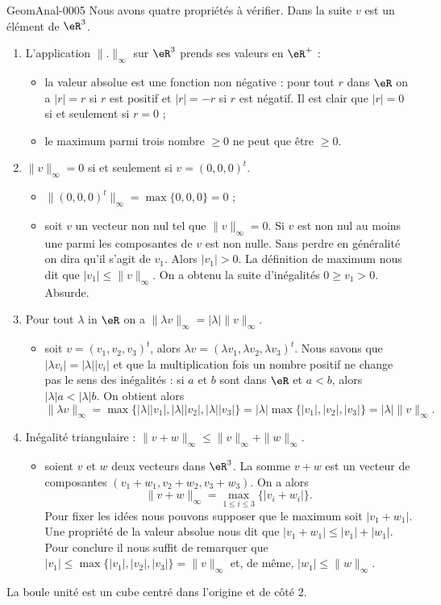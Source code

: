 \begin{corrige}{GeomAnal-0005}
Nous avons quatre propriétés à vérifier. Dans la suite $v$ est un élément de $\eR^3$.
\begin{enumerate}
\item L'application $\| . \|_{\infty}$ sur $\eR^3$ prends ses valeurs en $\eR^+$ :
  \begin{itemize}
  \item la valeur absolue est une fonction non négative : pour tout $r$ dans $\eR$ on a $|r|= r$ si $r$ est positif et $|r|= -r$ si $r$ est négatif. Il est clair que $|r|=0$ si et seulement si $r=0$ ;
  \item le maximum parmi trois nombre $\geq 0$ ne peut que être $\geq 0$.
  \end{itemize}
\item $\| v \|_{\infty}= 0$ si et seulement si $v=(0, 0, 0)^t$. 
  \begin{itemize}
  \item $\| (0,0,0)^t \|_{\infty}= \max\{0, 0 ,0\}= 0$ ;
  \item soit $v$ un vecteur non nul tel que $\| v \|_{\infty}= 0$. Si $v$ est non nul au moins une parmi les composantes de $v$ est non nulle. Sans perdre en généralité on dira qu'il s'agit de $v_1$. Alors $|v_1|> 0$. La définition de maximum nous dit que $|v_1|\leq \| v \|_{\infty}$. On a obtenu la suite d'inégalités $0\geq v_1>0$. Absurde.
  \end{itemize}
\item Pour tout $\lambda$ in $\eR$ on a  $\| \lambda v \|_{\infty}=|\lambda|\| v \|_{\infty}$. 
  \begin{itemize}
  \item soit $v=(v_1, v_2, v_3)^t$, alors $\lambda v= (\lambda v_1, \lambda v_2, \lambda v_3)^t$. Nous savons  que $|\lambda v_i|= |\lambda| |v_i|$ et que la multiplication fois un nombre positif ne change pas le sens des inégalités : si $a$ et $b$ sont dans $\eR$ et  $a<b$, alors $|\lambda| a < |\lambda| b$. On obtient alors 
\[
\| \lambda v \|_{\infty}=\max\{|\lambda| |v_1|,|\lambda| |v_2|, |\lambda| |v_3| \}= |\lambda| \max\{|v_1|, |v_2|, |v_3| \}=|\lambda|\| v \|_{\infty}.
\]   
  \end{itemize}
\item Inégalité triangulaire : $ \|v+w \|_{\infty}\leq\| v \|_{\infty}+\| w \|_{\infty}$.
  \begin{itemize}
  \item soient $v$ et $w$ deux vecteurs dans $\eR^3$. La somme $v+w$ est un vecteur de composantes $(v_1+w_1,v_2+w_2,v_3+w_3)$. On a alors 
\[
\|v+w \|_{\infty}=\max_{1\leq i\leq 3}\{|v_i+w_i|\}.
\]
Pour fixer les idées nous pouvons supposer que le maximum soit $|v_1+w_1|$. Une propriété de la valeur absolue nous dit que $|v_1+w_1|\leq|v_1|+|w_1|$. Pour conclure il nous suffit de remarquer que $|v_1|\leq \max\{|v_1|, |v_2|, |v_3| \}=\| v \|_{\infty}$ et, de même,  $|w_1|\leq \| w \|_{\infty}$.  
  \end{itemize}
\end{enumerate}

La boule unité est un cube centré dans l'origine et de côté 2.  

   
 

\end{corrige}
